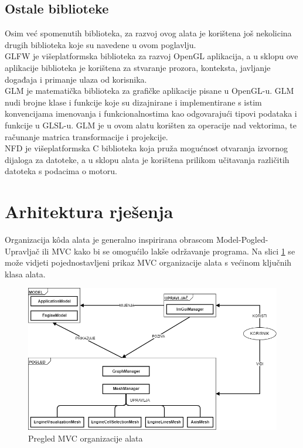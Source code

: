 \documentclass[times, utf8, diplomski]{fer}
\begin{document}
\subsection{Ostale biblioteke}
Osim već spomenutih biblioteka, za razvoj ovog alata je korištena još nekolicina drugih biblioteka koje su navedene u ovom poglavlju.\\

GLFW \citep{glfw} je višeplatformska biblioteka za razvoj OpenGL aplikacija, a u sklopu ove aplikacije biblioteka je korištena za stvaranje prozora, konteksta, javljanje događaja i primanje ulaza od korisnika.\\

GLM \citep{glm} je matematička biblioteka za grafičke aplikacije pisane u OpenGL-u. GLM nudi brojne klase i funkcije koje su dizajnirane i implementirane s istim konvencijama imenovanja i funkcionalnostima kao odgovarajući tipovi podataka i funkcije u GLSL-u. GLM je u ovom alatu korišten za operacije nad vektorima, te računanje matrica transformacije i projekcije.\\

NFD \citep{nfd}  je višeplatformska C biblioteka koja pruža mogućnost otvaranja izvornog dijaloga za datoteke, a u sklopu alata je korištena prilikom učitavanja različitih datoteka s podacima o motoru.

\section{Arhitektura rješenja} \label{codebase-architecture-section}

Organizacija k\^{o}da alata je generalno inspirirana obrascom Model-Pogled-Upravljač ili MVC  kako bi se omogućilo lakše održavanje programa. Na slici \ref{fig:high-level-overview} se može vidjeti pojednostavljeni prikaz MVC organizacije alata s većinom ključnih klasa alata.

\begin{figure} [H]
	\centering
    \includegraphics[width=\textwidth]{high_level_overview.png}
    \caption{Pregled MVC organizacije alata}
    \label{fig:high-level-overview}
\end{figure}
\ 
\\
\end{document}
